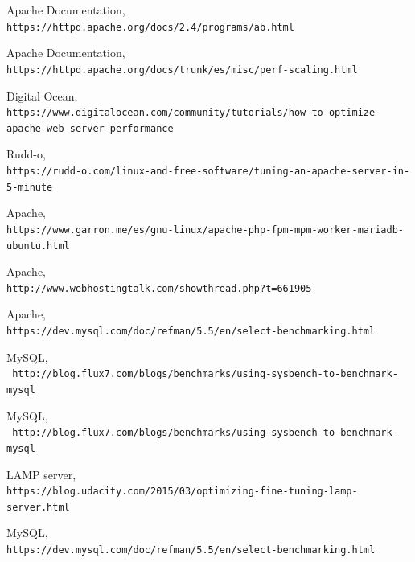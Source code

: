 \newpage
\begin{thebibliography}{9}
	
	Apache Documentation,
	\\\texttt{https://httpd.apache.org/docs/2.4/programs/ab.html}
	
	Apache Documentation,
	\\\texttt{https://httpd.apache.org/docs/trunk/es/misc/perf-scaling.html}
	
	Digital Ocean,
	\\\texttt{https://www.digitalocean.com/community/tutorials/how-to-optimize-apache-web-server-performance}
	
	Rudd-o,
	\\\texttt{https://rudd-o.com/linux-and-free-software/tuning-an-apache-server-in-5-minute}
	
	Apache,
	\\\texttt{https://www.garron.me/es/gnu-linux/apache-php-fpm-mpm-worker-mariadb-ubuntu.html}
	
	Apache,
	\\\texttt{http://www.webhostingtalk.com/showthread.php?t=661905}
	
	Apache,
	\\\texttt{https://dev.mysql.com/doc/refman/5.5/en/select-benchmarking.html}
	
	MySQL,
	\\\texttt{	http://blog.flux7.com/blogs/benchmarks/using-sysbench-to-benchmark-mysql}
	
	
	MySQL,
	\\\texttt{	http://blog.flux7.com/blogs/benchmarks/using-sysbench-to-benchmark-mysql}
	
	

	
	LAMP server,
	\\\texttt{https://blog.udacity.com/2015/03/optimizing-fine-tuning-lamp-server.html}
	
	
	
	MySQL,
	\\\texttt{https://dev.mysql.com/doc/refman/5.5/en/select-benchmarking.html}
	\\
	
	
\end{thebibliography}


